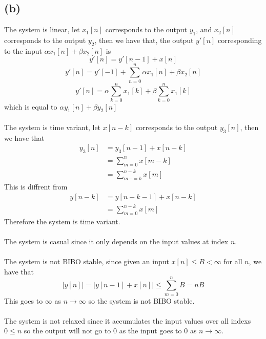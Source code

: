 \subsection*{(b)}
The system is linear, let 
$x_1[n]$ corresponds to the output $y_1$, and $x_2[n]$ corresponds to the output $y_2$, then we have that, 
the output $y'[n]$ corresponding to the input $\alpha x_1[n]+\beta x_2[n]$ is
$$y'[n]=y'[n-1]+x[n]$$
$$y'[n]=y'[-1]+\sum_{n=0}^{n}\alpha x_1[n]+\beta x_2[n]$$
$$y'[n]=\alpha\sum_{k=0}^{n}x_1[k]+\beta\sum_{k=0}^{n}x_1[k]$$
which is equal to $\alpha y_1[n]+\beta y_2[n]$\\\\
The system is time variant, let $x[n-k]$ corresponds to the output $y_3[n]$, then we have that
\begin{align*}
    y_3[n]&=y_3[n-1]+x[n-k]\\
    &=\sum_{m=0}^{n}x[m-k]\\
    &=\sum_{m-=k}^{n-k}x[m]
\end{align*}
This is diffrent from 
\begin{align*}
    y[n-k]&=y[n-k-1]+x[n-k]\\
    &=\sum_{m=0}^{n-k}x[m]
\end{align*}
Therefore the system is time variant.\\\\
The system is casual since it only depends on the input values at index $n$.\\\\
The system is not BIBO stable, since given an input $x[n]\leq B<\infty$ for all $n$, we have that
$$|y[n]|=|y[n-1]+x[n]|\leq \sum_{m=0}^{n}B =nB$$
This goes to $\infty$ as $n\to\infty$ so the system is not BIBO stable.\\\\
The system is not relaxed since it accumulates the input values over all indexs $0\leq n$ so
the output will not go to $0$ as the input goes to $0$ as $n\to\infty$.
